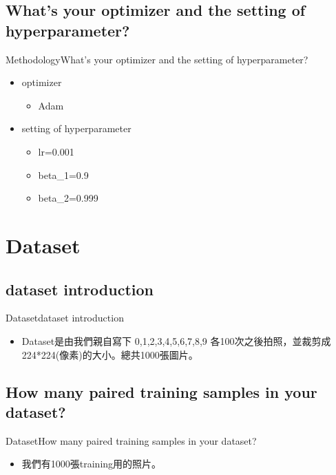\documentclass{beamer}
\begin{document}
\begin{CJK*}{UTF8}{bsmi}
\subsection*{What’s your optimizer and the setting of hyperparameter?}
\begin{frame}{Methodology}{What’s your optimizer and the setting of hyperparameter?}
  \begin{itemize}
  \item {
 optimizer 
  }
 \begin{itemize} 
\item Adam \\[0.5cm]
 \end{itemize}
 \item {
setting of hyperparameter
  }
 \begin{itemize} 
\item  lr=0.001
 \end{itemize}
 \begin{itemize} 
\item beta\_1=0.9 
 \end{itemize}
 \begin{itemize} 
\item beta\_2=0.999
 \end{itemize}
 \end{itemize}
\end{frame}

\section{Dataset}
\subsection*{dataset introduction}
\begin{frame}{Dataset}{dataset introduction}
  \begin{itemize}
  \item {
   Dataset是由我們親自寫下 0,1,2,3,4,5,6,7,8,9 各100次之後拍照，並裁剪成 224*224(像素)的大小。總共1000張圖片。
  }
  \end{itemize}
\end{frame}
\subsection*{How many paired training samples in your dataset?}
\begin{frame}{Dataset}{How many paired training samples in your dataset?}
  \begin{itemize}
  \item {
   我們有1000張training用的照片。
  }
  \end{itemize}
\end{frame}

\end{CJK*}
\end{document}
